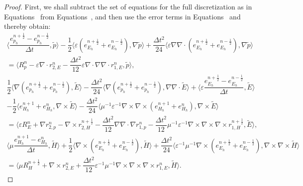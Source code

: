 \documentclass{amsart}
\theoremstyle{thmstyleone}%
\theoremstyle{thmstyletwo}%
\theoremstyle{thmstylethree}%
\newcommand{\aInnerproduct}[2]{\bigl\langle #1, #2 \bigr\rangle}
\begin{document}
\begin{proof}
 First, we shall subtract the set of equations for the full discretization as in Equations~ from Equations~,  and then use the error terms in Equations~ and thereby obtain:
 \begin{multline*}
\aInnerproduct{\dfrac{e_{p_h}^{n + \frac{1}{2}} - e_{p_h}^{n - \frac{1}{2}}}{\Delta t}}{\widetilde{p}} - \dfrac{1}{2} \aInnerproduct{ \varepsilon \left(e_{E_h}^{n + \frac{1}{2}} + e_{E_h}^{n - \frac{1}{2}} \right)}{\nabla \widetilde{p}} + \dfrac{\Delta t^2}{24} \aInnerproduct{\varepsilon \nabla \nabla \cdot \left( e_{E_h}^{n + \frac{1}{2}} + e_{E_h}^{n - \frac{1}{2}} \right)}{\nabla \widetilde{p}} \\ = \aInnerproduct{R_p^{n} - \varepsilon \nabla \cdot r_{2,E}^n - \dfrac{\Delta t^2}{12} \varepsilon \nabla \cdot \nabla \nabla \cdot r_{1,E}^n }{\widetilde{p}}, 
 \end{multline*} 
\begin{multline*}
 \dfrac{1}{2} \aInnerproduct{\nabla \left(e_{p_h}^{n + \frac{1}{2}} + e_{p_h}^{n - \frac{1}{2}}\right)}{\widetilde{E}}  - \dfrac{\Delta t^2}{24} \aInnerproduct{\nabla \left(e_{p_h}^{n + \frac{1}{2}} + e_{p_h}^{n - \frac{1}{2}} \right)}{\nabla \nabla \cdot \widetilde{E}} + \aInnerproduct{\varepsilon \dfrac{e_{E_h}^{n + \frac{1}{2}} - e_{E_h}^{n - \frac{1}{2}}}{\Delta t}}{\widetilde{E}} \\ - \dfrac{1}{2} \aInnerproduct{e_{H_h}^{n + 1} + e_{H_h}^n}{\nabla \times \widetilde{E}}  - \dfrac{\Delta t^2}{24} \aInnerproduct{ \mu^{-1}\varepsilon^{-1} \nabla \times \nabla \times \left( e_{H_h}^{n + 1} + e_{H_h}^n \right)}{\nabla \times \widetilde{E}} \\ = \aInnerproduct{\varepsilon R_E^n + \nabla r_{2,p}^n - \nabla \times r_{2,H}^{n+\frac{1}{2}} - \dfrac{\Delta t^2}{12} \nabla \nabla \cdot \nabla r_{1,p}^n - \dfrac{\Delta t^2}{12}  \mu^{-1}\varepsilon^{-1} \nabla \times \nabla \times \nabla \times r_{1,H}^{n+\frac{1}{2}}}{\widetilde{E}},
  \end{multline*} 
 \begin{multline*}
\aInnerproduct{\mu \dfrac{e_{H_h}^{n + 1} - e_{H_h}^{n}}{\Delta t}}{\widetilde{H}} +  \dfrac{1}{2}\aInnerproduct{\nabla \times\left(e_{E_h}^{n+\frac{1}{2}} + e_{E_h}^{n - \frac{1}{2}} \right)}{\widetilde{H}} +  \dfrac{\Delta t^2}{24} \aInnerproduct{\varepsilon^{-1}\mu^{-1} \nabla \times \left(e_{E_h}^{n + \frac{1}{2}} + e_{E_h}^{n - \frac{1}{2}} \right)}{\nabla \times  \nabla \times \widetilde{H}} \\ = \aInnerproduct{\mu R_H^{n + \frac{1}{2}} + \nabla \times r_{2,E}^n + \dfrac{\Delta t^2}{12} \varepsilon^{-1}\mu^{-1} \nabla \times \nabla \times \nabla \times r_{1,E}^n}{\widetilde{H}}.

\end{multline*}
\end{proof}
\end{document}
